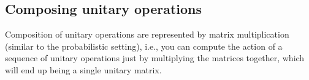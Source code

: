 \subsection{Composing unitary operations}
Composition of unitary operations are represented by matrix multiplication (similar to the probabilistic setting), i.e., you can compute the action of a sequence of unitary operations just by multiplying the matrices together, which will end up being a single unitary matrix.